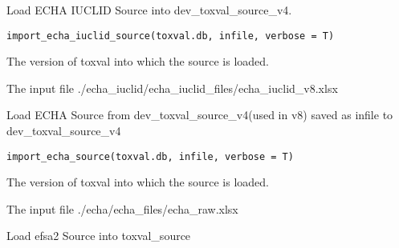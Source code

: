 \documentclass[letterpaper]{book}
\begin{document}
%
\begin{Description}\relax
Load ECHA IUCLID Source into dev\_toxval\_source\_v4.
\end{Description}
%
\begin{Usage}
\begin{verbatim}
import_echa_iuclid_source(toxval.db, infile, verbose = T)
\end{verbatim}
\end{Usage}
%
\begin{Arguments}
\begin{ldescription}
\item[\code{toxval.db}] The version of toxval into which the source is loaded.

\item[\code{infile}] The input file ./echa\_iuclid/echa\_iuclid\_files/echa\_iuclid\_v8.xlsx
\end{ldescription}
\end{Arguments}
%
\begin{Description}\relax
Load ECHA Source from dev\_toxval\_source\_v4(used in v8) saved as infile to dev\_toxval\_source\_v4
\end{Description}
%
\begin{Usage}
\begin{verbatim}
import_echa_source(toxval.db, infile, verbose = T)
\end{verbatim}
\end{Usage}
%
\begin{Arguments}
\begin{ldescription}
\item[\code{toxval.db}] The version of toxval into which the source is loaded.

\item[\code{infile}] The input file ./echa/echa\_files/echa\_raw.xlsx
\end{ldescription}
\end{Arguments}
%
\begin{Description}\relax
Load efsa2 Source into toxval\_source
\end{Description}
\end{document}
